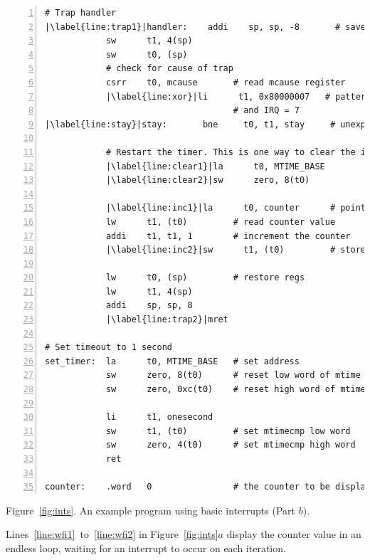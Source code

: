 \documentclass[11pt, twoside, pdftex]{article}
\begin{document}
\begin{center}
\begin{minipage}[h]{15 cm}
\begin{lstlisting}[style=defaultNiosVStyle, name=ints, numbers=left, escapechar=|]
# Trap handler
|\label{line:trap1}|handler:    addi    sp, sp, -8       # save regs that will be modified
            sw      t1, 4(sp)
            sw      t0, (sp)
            # check for cause of trap
            csrr    t0, mcause       # read mcause register
            |\label{line:xor}|li      t1, 0x80000007   # pattern to check interrupt bit
                                     # and IRQ = 7
|\label{line:stay}|stay:       bne     t0, t1, stay     # unexpected cause of exception
            
            # Restart the timer. This is one way to clear the interrupt
            |\label{line:clear1}|la      t0, MTIME_BASE
            |\label{line:clear2}|sw      zero, 8(t0)

            |\label{line:inc1}|la      t0, counter      # pointer to counter
            lw      t1, (t0)         # read counter value
            addi    t1, t1, 1        # increment the counter
            |\label{line:inc2}|sw      t1, (t0)         # store counter to memory

            lw      t0, (sp)         # restore regs
            lw      t1, 4(sp)
            addi    sp, sp, 8
            |\label{line:trap2}|mret

# Set timeout to 1 second
set_timer:  la      t0, MTIME_BASE   # set address
            sw      zero, 8(t0)      # reset low word of mtime
            sw      zero, 0xc(t0)    # reset high word of mtime
            
            li      t1, onesecond
            sw      t1, (t0)         # set mtimecmp low word
            sw      zero, 4(t0)      # set mtimecmp high word
            ret
     
counter:    .word   0                # the counter to be displayed\end{lstlisting}

\vspace{0.25in}
Figure~\ref{fig:ints}.	An example program using basic interrupts (Part $b$).
\end{minipage}
\end{center}

Lines~\ref{line:wfi1}~to~\ref{line:wfi2} in Figure~\ref{fig:ints}$a$ 
display the counter value in an endless loop,
waiting for an interrupt to occur on each iteration. 
\end{document}
